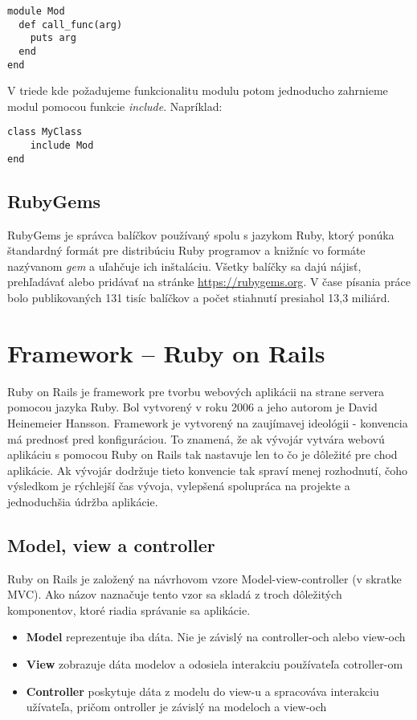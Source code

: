 \begin{verbatim}
module Mod
  def call_func(arg)
    puts arg
  end
end
\end{verbatim}

V triede kde požadujeme funkcionalitu modulu potom jednoducho zahrnieme modul pomocou funkcie \emph{include}. Napríklad:

\begin{verbatim}
class MyClass
    include Mod
end
\end{verbatim}

\subsection{RubyGems}

RubyGems je správca balíčkov používaný spolu s jazykom Ruby, ktorý ponúka štandardný formát pre distribúciu Ruby programov a knižníc vo formáte nazývanom \emph{gem} a uľahčuje ich inštaláciu. Všetky balíčky sa dajú nájisť, prehľadávať alebo pridávať na stránke \url{https://rubygems.org}. V čase písania práce bolo publikovaných 131 tisíc balíčkov a počet stiahnutí presiahol 13,3 miliárd.

\section{Framework -- Ruby on Rails}

Ruby on Rails je framework pre tvorbu webových aplikácii na strane servera pomocou jazyka Ruby. Bol vytvorený v roku 2006 a jeho autorom je David Heinemeier Hansson. Framework je vytvorený na zaujímavej ideológii - konvencia má prednosť pred konfiguráciou. To znamená, že ak vývojár vytvára webovú aplikáciu s pomocou Ruby on Rails tak nastavuje len to čo je dôležité pre chod aplikácie.
Ak vývojár dodržuje tieto konvencie tak spraví menej rozhodnutí, čoho výsledkom je rýchlejší čas vývoja, vylepšená spolupráca na projekte a jednoduchšia údržba aplikácie.

\subsection{Model, view a controller}

Ruby on Rails je založený na návrhovom vzore Model-view-controller (v skratke MVC). Ako názov naznačuje tento vzor sa skladá z troch dôležitých komponentov, ktoré riadia správanie sa aplikácie.

\begin{itemize}
    \item \textbf{Model} reprezentuje iba dáta. Nie je závislý na controller-och alebo view-och
    \item \textbf{View} zobrazuje dáta modelov a odosiela interakciu používateľa cotroller-om
    \item \textbf{Controller} poskytuje dáta z modelu do view-u a spracováva interakciu užívateľa, pričom ontroller je závislý na modeloch a view-och
\end{itemize}

